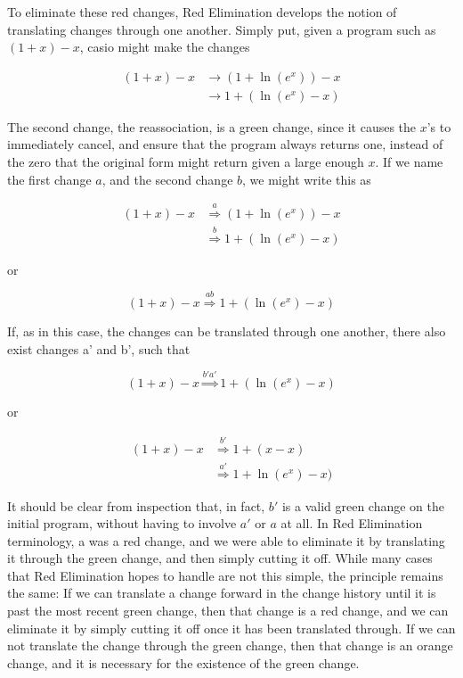 \documentclass{article}
\newcommand{\insetarrow}[1]{\stackrel{#1}{\Rightarrow}}
\newcommand{\lnexp}[1]{\ln{\left(e^{#1}\right)}}
\begin{document}
To eliminate these red changes, 
Red Elimination develops the notion of translating changes through one another. 
Simply put, 
given a program such as $(1 + x) - x$, 
casio might make the changes

\begin{align*}
(1 + x) - x
&\to (1 + \lnexp{x}) - x\\
&\to 1 + (\lnexp{x} - x)
\end{align*}

The second change, 
the reassociation, is a green change, 
since it causes the $x$'s to immediately cancel, 
and ensure that the program always returns one, 
instead of the zero that the original form might return 
given a large enough $x$. 
If we name the first change $a$, 
and the second change $b$, 
we might write this as 

\begin{align*}
(1 + x) - x&\insetarrow{a} (1 + \lnexp{x}) - x\\
&\insetarrow{b} 1 + (\lnexp{x} - x)
\end{align*}

or 

\[(1 + x) - x \insetarrow{ab} 1 + (\lnexp{x} - x)\]

If, as in this case, 
the changes can be translated through one another, 
there also exist changes a' and b', 
such that 

\[(1 + x) - x \insetarrow{b'a'} 1 + (\lnexp{x} - x)\]

or

\begin{align*}
(1 + x) - x &\insetarrow{b'} 1 + (x - x) \\
&\insetarrow{a'} 1 + \lnexp{x} - x)
\end{align*}


It should be clear from inspection that, in fact, 
$b'$ is a valid green change on the initial program, 
without having to involve $a'$ or $a$ at all. 
In Red Elimination terminology, 
a was a red change, 
and we were able to eliminate it 
by translating it through the green change, 
and then simply cutting it off. 
While many cases that Red Elimination hopes to handle 
are not this simple, 
the principle remains the same: 
If we can translate a change 
forward in the change history 
until it is past the most recent green change, 
then that change is a red change, 
and we can eliminate it by simply cutting it off 
once it has been translated through. 
If we can not translate the change through the green change, 
then that change is an orange change, 
and it is necessary for the existence of the green change.
\end{document}
